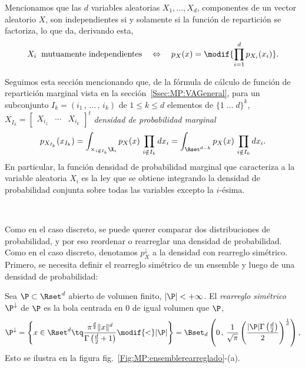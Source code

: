 Mencionamos que las $d$ variables  aleatorias $X_1, \ldots, X_d$, componentes de
un vector  aleatorio $X$, son independientes  si y solamente si  la funci\'on de
repartici\'on se factoriza, lo que da, derivando esta,
%
\[
X_i \:  \mbox{ mutuamente independientes} \quad \Leftrightarrow  \quad p_X(x) =
\modif{\prod_{i=1}^d p_{X_i}(x_i)}.
\]


Seguimos  esta  secci\'on mencionando  que,  de  la  f\'ormula de  c\'alculo  de
funci\'on       de      repartici\'on       marginal      vista       en      la
secci\'on~\ref{Ssec:MP:VAGeneral},  para un  subconjunto  $I_k =  (i_1  \, ,  \,
\ldots \, , \, i_k)$ de $1 \le k \le d$ elementos de $\{ 1 \; \ldots \; d \}^k$,
$X_{I_k}   =  \begin{bmatrix}   X_{i_1}  &   \cdots   &  X_{i_k}\end{bmatrix}^t$
 {\it densidad de probabilidad marginal}
%
\[
p_{X_{I_k}}(x_{I_k})  = \int_{\times_{i  \notin  I_k} \X_i}  p_X(x) \,  \prod_{i
    \notin I_k}  dx_i =  \int_{\Rset^{d-k}} p_X(x) \,  \prod_{i \notin
      I_k} dx_i.
\]
%
En particular, la funci\'on densidad  de probabilidad marginal que caracteriza a
la variable aleatoria  $X_i$ es la ley que se obtiene  integrando la densidad de
probabilidad conjunta sobre todas las variables excepto la $i$-\'esima.

\

Como  en  el caso  discreto,  se puede  querer  comparar  dos distribuciones  de
probabilidad, y  por eso  reordenar o rearreglar  una densidad  de probabilidad.
Como en el caso discreto, denotamos $p_X^\downarrow$ a la densidad con rearreglo
sim\'etrico.   Primero,  se necesita  definir  el  rearreglo  sim\'etrico de  un
ensemble y luego de una densidad de probabilidad:
%
\begin{definicion}
\label{Def:MP:RearregloConjunto}
%
  Sea $\P \subset \Rset^d$ abierto de  volumen finito, $|\P| < +\infty$.  El {\it
    rearreglo sim\'etrico} $\P^\downarrow$  de $\P$ es la bola  centrada en 0 de
 igual volumen que $\P$, \ie
  \[
    \P^\downarrow = \left\{
      x \in \Rset^d \tq \frac{\pi^{\frac{d}{2}} \|x\|^d}{\Gamma\left(\frac{d}{2}
      + 1\right)} \modif{<} |\P| \right\} = \Bset_d\left( 0 \,
      , \, \frac1{\sqrt{\pi}} \left( \frac{|\P| \Gamma\left( \frac{d}{2}
      \right)}{2} \right)^{\frac1d} \right),
  \]
  Esto se ilustra en la figura fig.~\ref{Fig:MP:ensemblerearreglado}-(a).
\end{definicion}


